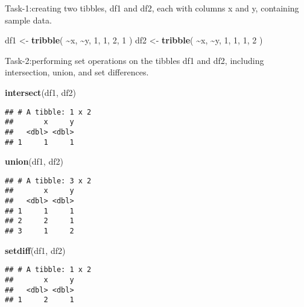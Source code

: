 \documentclass[
]{article}
\newenvironment{Shaded}{\begin{snugshade}}{\end{snugshade}}
\newcommand{\DecValTok}[1]{\textcolor[rgb]{0.00,0.00,0.81}{#1}}
\newcommand{\FunctionTok}[1]{\textcolor[rgb]{0.13,0.29,0.53}{\textbf{#1}}}
\newcommand{\NormalTok}[1]{#1}
\newcommand{\OtherTok}[1]{\textcolor[rgb]{0.56,0.35,0.01}{#1}}
\newcommand{\SpecialCharTok}[1]{\textcolor[rgb]{0.81,0.36,0.00}{\textbf{#1}}}
\begin{document}
Task-1:creating two tibbles, df1 and df2, each with columns x and y,
containing sample data.

\begin{Shaded}
\begin{Highlighting}[]
\NormalTok{df1 }\OtherTok{\textless{}{-}} \FunctionTok{tribble}\NormalTok{(}
  \SpecialCharTok{\textasciitilde{}}\NormalTok{x, }\SpecialCharTok{\textasciitilde{}}\NormalTok{y,}
   \DecValTok{1}\NormalTok{,  }\DecValTok{1}\NormalTok{,}
   \DecValTok{2}\NormalTok{,  }\DecValTok{1}
\NormalTok{)}
\NormalTok{df2 }\OtherTok{\textless{}{-}} \FunctionTok{tribble}\NormalTok{(}
  \SpecialCharTok{\textasciitilde{}}\NormalTok{x, }\SpecialCharTok{\textasciitilde{}}\NormalTok{y,}
   \DecValTok{1}\NormalTok{,  }\DecValTok{1}\NormalTok{,}
   \DecValTok{1}\NormalTok{,  }\DecValTok{2}
\NormalTok{)}
\end{Highlighting}
\end{Shaded}

Task-2:performing set operations on the tibbles df1 and df2, including
intersection, union, and set differences.

\begin{Shaded}
\begin{Highlighting}[]
\FunctionTok{intersect}\NormalTok{(df1, df2)}
\end{Highlighting}
\end{Shaded}

\begin{verbatim}
## # A tibble: 1 x 2
##       x     y
##   <dbl> <dbl>
## 1     1     1
\end{verbatim}

\begin{Shaded}
\begin{Highlighting}[]
\FunctionTok{union}\NormalTok{(df1, df2)}
\end{Highlighting}
\end{Shaded}

\begin{verbatim}
## # A tibble: 3 x 2
##       x     y
##   <dbl> <dbl>
## 1     1     1
## 2     2     1
## 3     1     2
\end{verbatim}

\begin{Shaded}
\begin{Highlighting}[]
\FunctionTok{setdiff}\NormalTok{(df1, df2)}
\end{Highlighting}
\end{Shaded}

\begin{verbatim}
## # A tibble: 1 x 2
##       x     y
##   <dbl> <dbl>
## 1     2     1
\end{verbatim}
\end{document}
